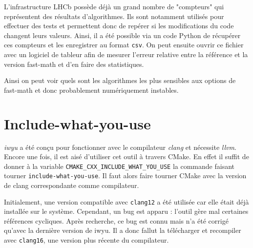 \documentclass[a4paper,11pt]{report}
\begin{document}
L'infrastructure LHCb possède déjà un grand nombre de "compteurs" qui représentent des résultats d'algorithmes.
Ils sont notamment utilisés pour effectuer des tests et permettent donc de repérer si les modifications du code changent leurs valeurs.
Ainsi, il a été possible via un code Python de récupérer ces compteurs et les enregistrer au format \verb'csv'.
On peut ensuite ouvrir ce fichier avec un logiciel de tableur afin de mesurer l'erreur relative entre la référence et la version fast-math et d'en faire des statistiques.

Ainsi on peut voir quels sont les algorithmes les plus sensibles aux options de fast-math et donc probablement numériquement instables.

\section{Include-what-you-use}
\emph{iwyu} a été conçu pour fonctionner avec le compilateur \emph{clang} et nécessite \emph{llvm}.
Encore une fois, il est aisé d'utiliser cet outil à travers CMake.
En effet il suffit de donner à la variable \verb'CMAKE_CXX_INCLUDE_WHAT_YOU_USE' la commande faisant tourner \verb'include-what-you-use'.
Il faut alors faire tourner CMake avec la version de clang correspondante comme compilateur.

Initialement, une version compatible avec \verb'clang12' a été utilisée car elle était déjà installée sur le système.
Cependant, un bug est apparu : l'outil gère mal certaines références cycliques.
Après recherche, ce bug  est connu mais n'a été corrigé qu'avec la dernière version de iwyu.
Il a donc fallut la télécharger et recompiler avec \verb'clang16', une version plus récente du compilateur.
\end{document}
